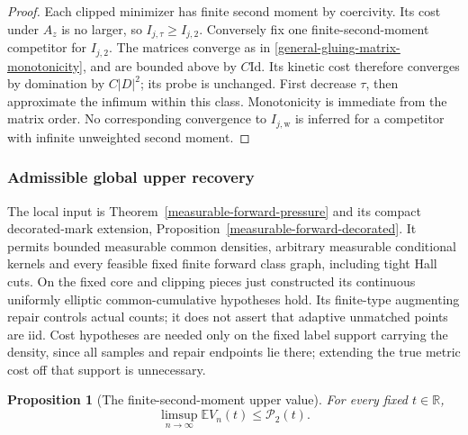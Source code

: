 \documentclass[11pt,reqno]{amsart}
\newtheorem{proposition}[theorem]{Proposition}
\theoremstyle{definition}
\theoremstyle{remark}
\numberwithin{equation}{section}
\newcommand{\R}{\mathbb R}
\newcommand{\E}{\mathbb E}
\begin{document}
\begin{proof}
Each clipped minimizer has finite second moment by coercivity. Its cost
under \(A_z\) is no larger, so \(I_{j,\tau}\ge I_{j,2}\). Conversely
fix one finite-second-moment competitor for \(I_{j,2}\). The matrices
converge as in \eqref{general-gluing-matrix-monotonicity}, and are bounded
above by \(C\mathrm{Id}\). Its kinetic cost therefore converges by
domination by \(C|D|^2\); its probe is unchanged. First decrease
\(\tau\), then approximate the infimum within this class. Monotonicity
is immediate from the matrix order. No corresponding convergence to
\(I_{j,\mathrm w}\) is inferred for a competitor with infinite
unweighted second moment.
\end{proof}

\subsubsection{Admissible global upper recovery}

The local input is Theorem~\ref{measurable-forward-pressure} and its
compact decorated-mark extension,
Proposition~\ref{measurable-forward-decorated}. It permits bounded measurable
common densities, arbitrary measurable conditional kernels and every
feasible fixed finite forward class graph, including tight Hall cuts.
On the fixed core and clipping pieces just constructed its continuous
uniformly elliptic common-cumulative hypotheses hold. Its finite-type
augmenting repair controls actual counts; it does not assert that adaptive
unmatched points are iid. Cost hypotheses are needed only on the fixed
label support carrying the density, since all samples and repair endpoints
lie there; extending the true metric cost off that support is unnecessary.

\begin{proposition}[The finite-second-moment upper value]
\label{general-gluing-second-moment-upper}
For every fixed \(t\in\R\),
\begin{equation}
\label{general-gluing-expectation-upper}
 \limsup_{n\to\infty}\E V_n(t)\le\mathcal P_2(t).
\end{equation}
\end{proposition}
\end{document}
